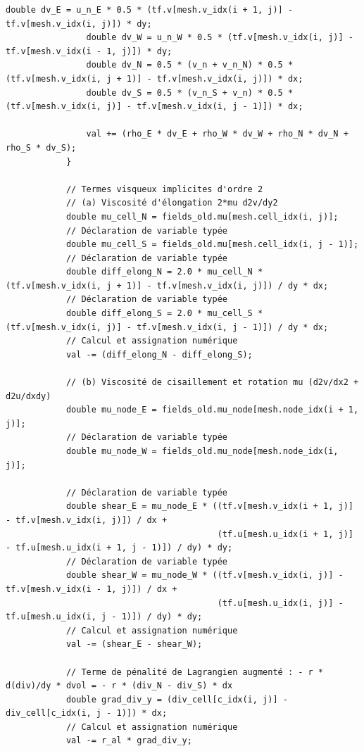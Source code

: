 \documentclass[10pt,a4paper,oneside]{book}
\begin{document}
\begin{lstlisting}[language={[11]C++}]
                double dv_E = u_n_E * 0.5 * (tf.v[mesh.v_idx(i + 1, j)] - tf.v[mesh.v_idx(i, j)]) * dy;
                double dv_W = u_n_W * 0.5 * (tf.v[mesh.v_idx(i, j)] - tf.v[mesh.v_idx(i - 1, j)]) * dy;
                double dv_N = 0.5 * (v_n + v_n_N) * 0.5 * (tf.v[mesh.v_idx(i, j + 1)] - tf.v[mesh.v_idx(i, j)]) * dx;
                double dv_S = 0.5 * (v_n_S + v_n) * 0.5 * (tf.v[mesh.v_idx(i, j)] - tf.v[mesh.v_idx(i, j - 1)]) * dx;

                val += (rho_E * dv_E + rho_W * dv_W + rho_N * dv_N + rho_S * dv_S);
            }

            // Termes visqueux implicites d'ordre 2
            // (a) Viscosité d'élongation 2*mu d2v/dy2
            double mu_cell_N = fields_old.mu[mesh.cell_idx(i, j)];
            // Déclaration de variable typée
            double mu_cell_S = fields_old.mu[mesh.cell_idx(i, j - 1)];
            // Déclaration de variable typée
            double diff_elong_N = 2.0 * mu_cell_N * (tf.v[mesh.v_idx(i, j + 1)] - tf.v[mesh.v_idx(i, j)]) / dy * dx;
            // Déclaration de variable typée
            double diff_elong_S = 2.0 * mu_cell_S * (tf.v[mesh.v_idx(i, j)] - tf.v[mesh.v_idx(i, j - 1)]) / dy * dx;
            // Calcul et assignation numérique
            val -= (diff_elong_N - diff_elong_S);

            // (b) Viscosité de cisaillement et rotation mu (d2v/dx2 + d2u/dxdy)
            double mu_node_E = fields_old.mu_node[mesh.node_idx(i + 1, j)];
            // Déclaration de variable typée
            double mu_node_W = fields_old.mu_node[mesh.node_idx(i, j)];

            // Déclaration de variable typée
            double shear_E = mu_node_E * ((tf.v[mesh.v_idx(i + 1, j)] - tf.v[mesh.v_idx(i, j)]) / dx +
                                          (tf.u[mesh.u_idx(i + 1, j)] - tf.u[mesh.u_idx(i + 1, j - 1)]) / dy) * dy;
            // Déclaration de variable typée
            double shear_W = mu_node_W * ((tf.v[mesh.v_idx(i, j)] - tf.v[mesh.v_idx(i - 1, j)]) / dx +
                                          (tf.u[mesh.u_idx(i, j)] - tf.u[mesh.u_idx(i, j - 1)]) / dy) * dy;
            // Calcul et assignation numérique
            val -= (shear_E - shear_W);

            // Terme de pénalité de Lagrangien augmenté : - r * d(div)/dy * dvol = - r * (div_N - div_S) * dx
            double grad_div_y = (div_cell[c_idx(i, j)] - div_cell[c_idx(i, j - 1)]) * dx;
            // Calcul et assignation numérique
            val -= r_al * grad_div_y;


\end{lstlisting}
\end{document}
